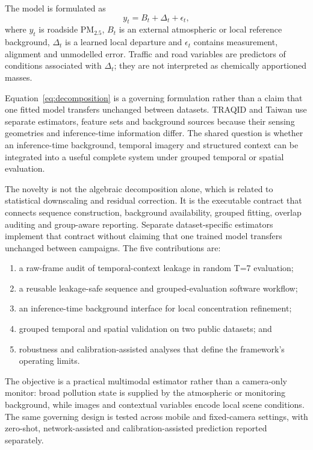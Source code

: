 \documentclass[review,12pt,authoryear]{elsarticle}
\newcommand{\PM}[1]{\ensuremath{\mathrm{PM}_{#1}}}
\newcommand{\pmfine}{\PM{2.5}}
\begin{document}
The model is formulated as
\begin{equation}
 y_t = B_t + \Delta_t + \epsilon_t,
 \label{eq:decomposition}
\end{equation}
where $y_t$ is roadside \pmfine, $B_t$ is an external atmospheric or local
reference background, $\Delta_t$ is a learned local departure and $\epsilon_t$
contains measurement, alignment and unmodelled error. Traffic and road
variables are predictors of conditions associated with $\Delta_t$; they are
not interpreted as chemically apportioned masses.

Equation~\ref{eq:decomposition} is a governing formulation rather than a claim
that one fitted model transfers unchanged between datasets. TRAQID and Taiwan
use separate estimators, feature sets and background sources because their
sensing geometries and inference-time information differ. The shared question
is whether an inference-time background, temporal imagery and structured
context can be integrated into a useful complete system under grouped temporal
or spatial evaluation.

The novelty is not the algebraic decomposition alone, which is related to
statistical downscaling and residual correction. It is the executable contract
that connects sequence construction, background availability, grouped fitting,
overlap auditing and group-aware reporting. Separate dataset-specific estimators
implement that contract without claiming that one trained model transfers
unchanged between campaigns. The five contributions are:
\begin{enumerate}
  \item a raw-frame audit of temporal-context leakage in random T=7 evaluation;
  \item a reusable leakage-safe sequence and grouped-evaluation software workflow;
  \item an inference-time background interface for local concentration refinement;
  \item grouped temporal and spatial validation on two public datasets; and
  \item robustness and calibration-assisted analyses that define the framework's
        operating limits.
\end{enumerate}

The objective is a practical multimodal estimator rather than a camera-only
monitor: broad pollution state is supplied by the atmospheric or monitoring
background, while images and contextual variables encode local scene
conditions. The same governing design is tested across mobile and fixed-camera
settings, with zero-shot, network-assisted and calibration-assisted prediction
reported separately.
\end{document}
